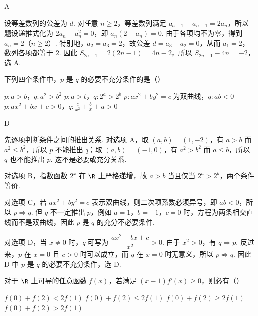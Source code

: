 \begin{answer}
A
\end{answer}

\begin{solution}
设等差数列的公差为 \(d\). 对任意 \(n\geqslant2\)，等差数列满足 \(a_{n+1}+a_{n-1}=2a_n\)，所以题设递推式化为 \(2a_n-a_n^2=0\)，即 \(a_n(2-a_n)=0\). 由于各项均不为零，得到 \(a_n=2\)（\(n\geqslant2\)）. 特别地，\(a_2=a_3=2\)，故公差 \(d=a_3-a_2=0\)，从而 \(a_1=2\)，数列各项都等于 \(2\). 因此 \(S_{2n-1}=2(2n-1)=4n-2\)，所以 \(S_{2n-1}-4n=-2\)，选 A.
\end{solution}

\begin{problem}
下列四个条件中，\(p\) 是 \(q\) 的必要不充分条件的是（\quad）

\choices
    {\(p: a > b\)，\(q: a^2 > b^2\)}
    {\(p: a > b\)，\(q: 2^{a} > 2^{b}\)}
    {\(p: ax^2 + by^2 = c\) 为双曲线，\(q: ab < 0\)}
    {\(p: ax^2 + bx + c > 0\)，\(q: \frac{c}{x^2} + \frac{b}{x} + a > 0\)}
\end{problem}

\begin{answer}
D
\end{answer}

\begin{solution}
先逐项判断条件之间的推出关系. 对选项 A，取 \((a,b)=(1,-2)\)，有 \(a>b\) 而 \(a^2\leqslant b^2\)，所以 \(p\) 不能推出 \(q\)；取 \((a,b)=(-1,0)\)，有 \(a^2>b^2\) 而 \(a\leqslant b\)，所以 \(q\) 也不能推出 \(p\). 这不是必要或充分关系.

对选项 B，指数函数 \(2^x\) 在 \(\R\) 上严格递增，故 \(a>b\) 当且仅当 \(2^a>2^b\)，两个条件等价.

对选项 C，若 \(ax^2+by^2=c\) 表示双曲线，则二次项系数必须异号，即 \(ab<0\)，所以 \(p\Rightarrow q\). 但 \(q\) 不一定推出 \(p\)，例如 \(a=1\)，\(b=-1\)，\(c=0\) 时，方程为两条相交直线而不是双曲线，因此 \(p\) 是 \(q\) 的充分不必要条件.

对选项 D，当 \(x\ne0\) 时，\(q\) 可写为 \(\dfrac{ax^2+bx+c}{x^2}>0\). 由于 \(x^2>0\)，有 \(q\Rightarrow p\). 反过来，\(p\) 在 \(x=0\) 且 \(c>0\) 时可以成立，而 \(q\) 在 \(x=0\) 时无意义，所以 \(p\not\Rightarrow q\). 因此 D 中 \(p\) 是 \(q\) 的必要不充分条件，选 D.
\end{solution}

\begin{problem}
对于 \(\R\) 上可导的任意函数 \(f(x)\)，若满足 \((x - 1)f'(x) \geqslant 0\)，则必有（\quad）

\choices
    {\(f(0) + f(2) < 2f(1)\)}
    {\(f(0) + f(2)\leqslant 2f(1)\)}
    {\(f(0) + f(2)\geqslant 2f(1)\)}
    {\(f(0) + f(2) > 2f(1)\)}
\end{problem}

